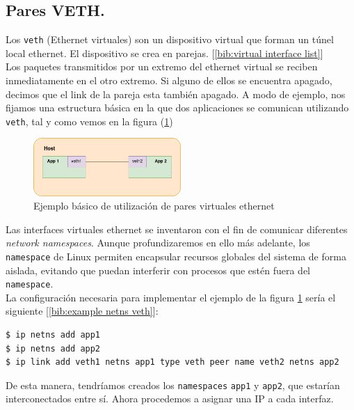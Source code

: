 \documentclass[12pt]{article}
\begin{document}
	\pagebreak
	
	\subsection{Pares VETH.}
	\noindent Los \texttt{veth} (Ethernet virtuales) son un dispositivo virtual que forman un túnel local ethernet. El dispositivo se crea en parejas. [\ref{bib:virtual interface list}]\\
	
	\noindent Los paquetes transmitidos por un extremo del ethernet virtual se reciben inmediatamente en el otro extremo. Si alguno de ellos se encuentra apagado, decimos que el link de la pareja esta también apagado. A modo de ejemplo, nos fijamos una estructura básica en la que dos aplicaciones se comunican utilizando \texttt{veth}, tal y como vemos en la figura (\ref{ej1 veth})\\
	
	\begin{figure}[h]
		\begin{center}
			\includegraphics[width=0.5\textwidth]{img/veth_ej1.png}
			\caption{Ejemplo básico de utilización de pares virtuales ethernet}
			\label{ej1 veth}
		\end{center}
	\end{figure}

	\noindent Las interfaces virtuales ethernet se inventaron con el fin de comunicar diferentes \textit{network namespaces}. Aunque profundizaremos en ello más adelante, los \texttt{namespace} de Linux permiten encapsular recursos globales del sistema de forma aislada, evitando que puedan interferir con procesos que estén fuera del \texttt{namespace}.\\
	
	\noindent La configuración necesaria para implementar el ejemplo de la figura \ref{ej1 veth} sería el siguiente [\ref{bib:example netns veth}]:
	
	\begin{verbatim}
$ ip netns add app1
$ ip netns add app2
$ ip link add veth1 netns app1 type veth peer name veth2 netns app2
	\end{verbatim}
	
	\noindent De esta manera, tendríamos creados los \texttt{namespaces} \texttt{app1} y \texttt{app2}, que estarían interconectados entre sí. Ahora procedemos a asignar una IP a cada interfaz. 
	
\end{document}

